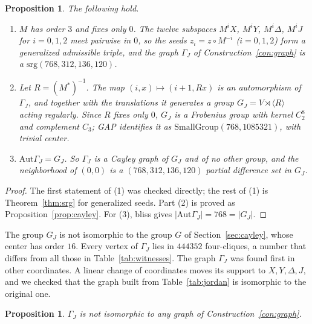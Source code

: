 \documentclass[11pt]{amsart}
\newtheorem{proposition}[theorem]{Proposition}
\theoremstyle{definition}
\newcommand{\srg}{\mathrm{srg}}
\newcommand{\Aut}{\mathrm{Aut}}
\begin{document}
\begin{proposition}\label{prop:jordan}
The following hold.
\begin{enumerate}
\item $M$ has order $3$ and fixes only $0$. The twelve subspaces $M^iX$, $M^iY$, $M^i\Delta$, $M^iJ$ for $i=0,1,2$ meet pairwise in $0$, so the seeds $z_i=z\circ M^{-i}$ ($i=0,1,2$) form a generalized admissible triple, and the graph $\Gamma_J$ of Construction~\ref{con:graph} is a $\srg(768,312,136,120)$.
\item Let $R=(M^*)^{-1}$. The map $(i,x)\mapsto(i+1,Rx)$ is an automorphism of $\Gamma_J$, and together with the translations it generates a group $G_J=V\rtimes\langle R\rangle$ acting regularly. Since $R$ fixes only $0$, $G_J$ is a Frobenius group with kernel $C_2^8$ and complement $C_3$; GAP identifies it as $\mathrm{SmallGroup}(768,1085321)$, with trivial center.
\item $\Aut\Gamma_J=G_J$. So $\Gamma_J$ is a Cayley graph of $G_J$ and of no other group, and the neighborhood of $(0,0)$ is a $(768,312,136,120)$ partial difference set in $G_J$.
\end{enumerate}
\end{proposition}

\begin{proof}
The first statement of (1) was checked directly; the rest of (1) is Theorem~\ref{thm:srg} for generalized seeds. Part (2) is proved as Proposition~\ref{prop:cayley}. For (3), bliss gives $|\Aut\Gamma_J|=768=|G_J|$.
\end{proof}

The group $G_J$ is not isomorphic to the group $G$ of Section~\ref{sec:cayley}, whose center has order $16$. Every vertex of $\Gamma_J$ lies in $444352$ four-cliques, a number that differs from all those in Table~\ref{tab:witnesses}. The graph $\Gamma_J$ was found first in other coordinates. A linear change of coordinates moves its support to $X,Y,\Delta,J$, and we checked that the graph built from Table~\ref{tab:jordan} is isomorphic to the original one.

\begin{proposition}\label{prop:notform}
$\Gamma_J$ is not isomorphic to any graph of Construction~\ref{con:graph}.
\end{proposition}
\end{document}

